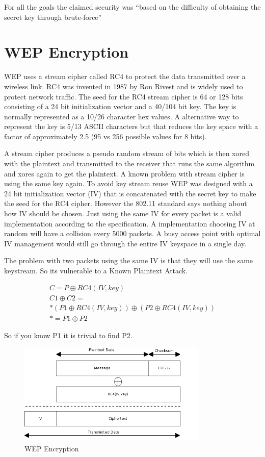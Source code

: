\documentclass[twocolumn,11pt]{IEEEtran}
\begin{document}
For all the goals the claimed security was ``based on the difficulty of obtaining the secret key through brute-force''\cite{IEEE:Fast}


\section {WEP Encryption}
\label{sec:WEP_Encryption}

WEP uses a stream cipher called RC4 to protect the data transmitted over a wireless link. RC4 was invented in 1987 by Ron Rivest and is widely used to protect network traffic. The seed for the RC4 stream cipher is 64 or 128 bits consisting of a 24 bit initialization vector and a 40/104 bit key. The key is normally represented as a 10/26 character hex values. A alternative way to represent the key is 5/13 ASCII characters but that reduces the key space with a factor of approximately 2.5 (95 vs 256 possible values for 8 bits).

A stream cipher produces a pseudo random stream of bits which is then xored with the plaintext and transmitted to the receiver that runs the same algorithm and xores again to get the plaintext. A known problem with stream cipher is using the same key again. To avoid key stream reuse WEP was designed with a 24 bit initialization vector (IV) that is concatenated with the secret key to make the seed for the RC4 cipher. However the 802.11 standard says nothing about how IV should be chosen. Just using the same IV for every packet is a valid implementation according to the specification. A implementation choosing IV at random will have a collision every 5000 packets\cite{Borisov:New}. A busy access point with optimal IV management would still go through the entire IV keyspace in a single day.

The problem with two packets using the same IV is that they will use the same keystream. So its vulnerable to a Known Plaintext Attack.

\begin{align*}
C = P \oplus RC4(IV,key) \\
C1 \oplus C2 = \\*
(P1 \oplus RC4(IV,key) ) \oplus ( P2 \oplus RC4(IV,key)) \\*
= P1 \oplus P2
\end{align*}

So if you know P1 it is trivial to find P2. 

\begin{figure}
\includegraphics[width=90mm]{WEP_Encryption.png}
\caption{WEP Encryption}
\end{figure}
\end{document}
